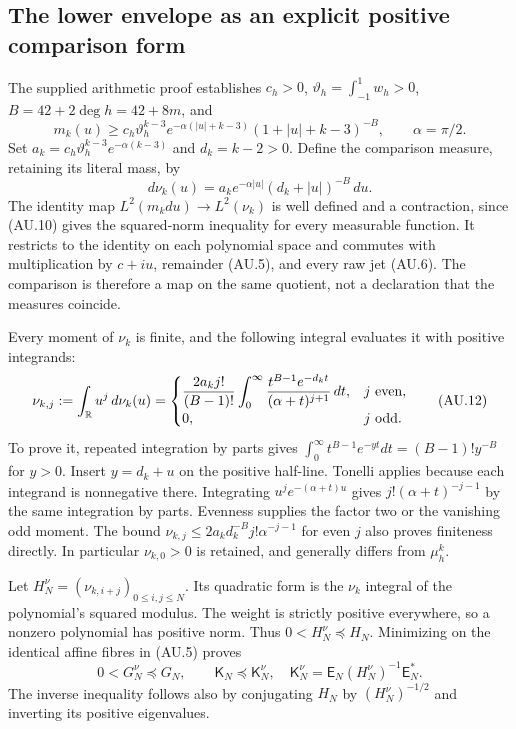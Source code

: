 \subsection{The lower envelope as an explicit positive comparison form}

The supplied arithmetic proof establishes $c_h>0$,
$\vartheta_h=\int_{-1}^1w_h>0$, $B=42+2\deg h=42+8m$, and
\[
 m_k(u)\ge c_h\vartheta_h^{k-3}
 e^{-\alpha(|u|+k-3)}(1+|u|+k-3)^{-B},\qquad\alpha=\pi/2.
 \tag{AU.10}
\]
Set $a_k=c_h\vartheta_h^{k-3}e^{-\alpha(k-3)}$ and $d_k=k-2>0$.
Define the comparison measure, retaining its literal mass, by
\[
 d\nu_k(u)=a_k e^{-\alpha|u|}(d_k+|u|)^{-B}\,du.
 \tag{AU.11}
\]
The identity map $L^2(m_kdu)\to L^2(\nu_k)$ is well defined and a
contraction, since (AU.10) gives the squared-norm inequality for every
measurable function. It restricts to the identity on each polynomial
space and commutes with multiplication by $c+iu$, remainder (AU.5),
and every raw jet (AU.6). The comparison is therefore a map on the same
quotient, not a declaration that the measures coincide.

Every moment of $\nu_k$ is finite, and the following integral evaluates
it with positive integrands:
\[
 \nu_{k,j}:=\int_{\mathbb{R}} u^j\,d\nu_k(u)=
 \begin{cases}
 \displaystyle\frac{2a_kj!}{(B-1)!}
 \int_0^\infty\frac{t^{B-1}e^{-d_kt}}{(\alpha+t)^{j+1}}\,dt,
   &j\text{ even},\\
 0,&j\text{ odd}.
 \end{cases}                                                \tag{AU.12}
\]
To prove it, repeated integration by parts gives
$\int_0^\infty t^{B-1}e^{-yt}dt=(B-1)!y^{-B}$ for $y>0$.
Insert $y=d_k+u$ on the positive half-line. Tonelli applies because
each integrand is nonnegative there. Integrating $u^je^{-(\alpha+t)u}$
gives $j!(\alpha+t)^{-j-1}$ by the same integration by parts. Evenness
supplies the factor two or the vanishing odd moment. The bound
$\nu_{k,j}\le2a_kd_k^{-B}j!\alpha^{-j-1}$ for even $j$ also proves
finiteness directly. In particular $\nu_{k,0}>0$ is retained, and
generally differs from $\mu_h^k$.

Let $H_N^\nu=(\nu_{k,i+j})_{0\le i,j\le N}$. Its quadratic form is
the $\nu_k$ integral of the polynomial's squared modulus. The weight
is strictly positive everywhere, so a nonzero polynomial has positive
norm. Thus $0<H_N^\nu\preceq H_N$. Minimizing on the identical
affine fibres in (AU.5) proves
\[
 0<G_N^\nu\preceq G_N,\qquad
 \mathsf K_N\preceq\mathsf K_N^\nu,
 \quad \mathsf K_N^\nu=\mathsf E_N(H_N^\nu)^{-1}\mathsf E_N^*.
 \tag{AU.13}
\]
The inverse inequality follows also by conjugating $H_N$ by
$(H_N^\nu)^{-1/2}$ and inverting its positive eigenvalues.

